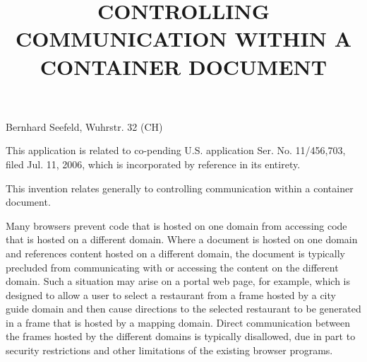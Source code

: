 %
%
%
%



\timestamp	
{}

\title{CONTROLLING COMMUNICATION WITHIN A CONTAINER DOCUMENT}


             {Bernhard Seefeld, Wuhrstr. 32 (CH)}

\crossreference

This application is related to co-pending
U.S. application Ser. No. 11/456,703, filed Jul. 11, 2006, which is
incorporated by reference in its entirety.

\background

This invention relates generally to controlling
communication within a container document.

Many browsers prevent code that is hosted on one domain
from accessing code that is hosted on a different domain. Where a
document is hosted on one domain and references content hosted on a
different domain, the document is typically precluded from
communicating with or accessing the content on the different
domain. Such a situation may arise on a portal web page, for example,
which is designed to allow a user to select a restaurant from a frame
hosted by a city guide domain and then cause directions to the
selected restaurant to be generated in a frame that is hosted by a
mapping domain. Direct communication between the frames hosted by the
different domains is typically disallowed, due in part to security
restrictions and other limitations of the existing browser
programs.

